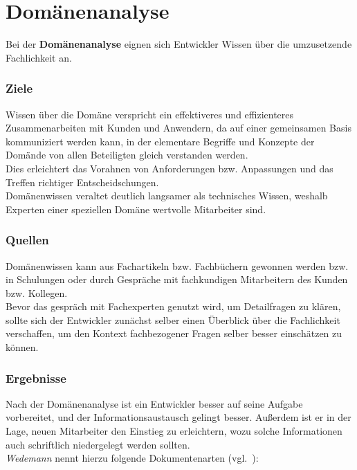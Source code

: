 \section{Domänenanalyse}\label{sec:domanenanalyse}

\noindent
Bei der \textbf{Domänenanalyse} eignen sich Entwickler Wissen über die umzusetzende Fachlichkeit an.\\

\subsubsection*{Ziele}
Wissen über die Domäne verspricht ein effektiveres und effizienteres Zusammenarbeiten mit Kunden und Anwendern, da auf einer gemeinsamen Basis kommuniziert werden kann, in der elementare Begriffe und Konzepte der Domände von allen Beteiligten gleich verstanden werden.\\
Dies erleichtert das Vorahnen von Anforderungen bzw. Anpassungen und das Treffen richtiger Entscheidschungen.\\
Domänenwissen veraltet deutlich langsamer als technisches Wissen, weshalb Experten einer speziellen Domäne wertvolle Mitarbeiter sind.\\

\subsubsection*{Quellen}
Domänenwissen kann aus Fachartikeln bzw. Fachbüchern gewonnen werden bzw. in Schulungen oder durch Gespräche mit fachkundigen Mitarbeitern des Kunden bzw. Kollegen.\\
Bevor das gespräch mit Fachexperten genutzt wird, um Detailfragen zu klären, sollte sich der Entwickler zunächst selber einen Überblick über die Fachlichkeit verschaffen, um den Kontext fachbezogener Fragen selber besser einschätzen zu können.\\

\subsubsection*{Ergebnisse}
Nach der Domänenanalyse ist ein Entwickler besser auf seine Aufgabe vorbereitet, und der Informationsaustausch gelingt besser.
Außerdem ist er in der Lage, neuen Mitarbeiter den Einstieg zu erleichtern, wozu solche Informationen auch schriftlich niedergelegt werden sollten.\\
\textit{Wedemann} nennt hierzu folgende Dokumentenarten (vgl.~\cite[42]{Wed09}):

